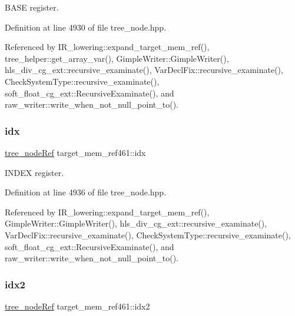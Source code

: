 B\+A\+SE register. 



Definition at line 4930 of file tree\+\_\+node.\+hpp.



Referenced by I\+R\+\_\+lowering\+::expand\+\_\+target\+\_\+mem\+\_\+ref(), tree\+\_\+helper\+::get\+\_\+array\+\_\+var(), Gimple\+Writer\+::\+Gimple\+Writer(), hls\+\_\+div\+\_\+cg\+\_\+ext\+::recursive\+\_\+examinate(), Var\+Decl\+Fix\+::recursive\+\_\+examinate(), Check\+System\+Type\+::recursive\+\_\+examinate(), soft\+\_\+float\+\_\+cg\+\_\+ext\+::\+Recursive\+Examinate(), and raw\+\_\+writer\+::write\+\_\+when\+\_\+not\+\_\+null\+\_\+point\+\_\+to().

\mbox{\label{structtarget__mem__ref461_a519ffb34c63dc54a2bf699e6f9713c33}} 
\subsubsection{\texorpdfstring{idx}{idx}}
{\footnotesize\ttfamily \hyperlink{tree__node_8hpp_a6ee377554d1c4871ad66a337eaa67fd5}{tree\+\_\+node\+Ref} target\+\_\+mem\+\_\+ref461\+::idx}



I\+N\+D\+EX register. 



Definition at line 4936 of file tree\+\_\+node.\+hpp.



Referenced by I\+R\+\_\+lowering\+::expand\+\_\+target\+\_\+mem\+\_\+ref(), Gimple\+Writer\+::\+Gimple\+Writer(), hls\+\_\+div\+\_\+cg\+\_\+ext\+::recursive\+\_\+examinate(), Var\+Decl\+Fix\+::recursive\+\_\+examinate(), Check\+System\+Type\+::recursive\+\_\+examinate(), soft\+\_\+float\+\_\+cg\+\_\+ext\+::\+Recursive\+Examinate(), and raw\+\_\+writer\+::write\+\_\+when\+\_\+not\+\_\+null\+\_\+point\+\_\+to().

\mbox{\label{structtarget__mem__ref461_a5e5109bad41b5b1c855d46691ee6d061}} 
\subsubsection{\texorpdfstring{idx2}{idx2}}
{\footnotesize\ttfamily \hyperlink{tree__node_8hpp_a6ee377554d1c4871ad66a337eaa67fd5}{tree\+\_\+node\+Ref} target\+\_\+mem\+\_\+ref461\+::idx2}




